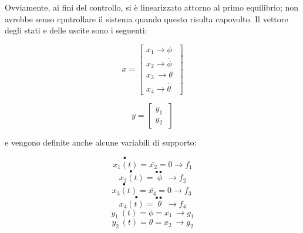 Ovviamente, ai fini del controllo, si è linearizzato attorno al primo equilibrio; non avrebbe senso cpntrollare il sistema quando questo risulta capovolto.
Il vettore degli stati e delle uscite sono i seguenti:
\begin{center}
	$$
	x=\left\lbrack \begin{array}{c}
		x_1 \to \phi \;\\
		x_2 \to \dot{\phi \;} \\
		x_{3\;} \to \theta \;\\
		x_4 \to \dot{\theta \;} 
	
		\end{array}\right\rbrack
	$$
	
	$$
	y=\left\lbrack \begin{array}{c}
	y_1\;\\
	y_2\;
	
\end{array}\right\rbrack
	$$
\end{center}
e vengono definite anche alcune variabili di supporto:
\begin{center}
	$$
	\overset{\bullet \;}{x_1 \left(t\right)} =\bar{x_2 } =0\to f_1
	$$
	$$
	\overset{\bullet \;}{x_2 \left(t\right)} =\overset{\bullet \bullet \;\;}{\phi \;} \to f_2
	$$
	$$
	\overset{\bullet \;}{x_3 \left(t\right)} =\bar{x_4 } =0\to f_{3\;}
	$$
	$$
	\overset{\bullet \;}{x_4 \left(t\right)=} \overset{\bullet \bullet \;\;}{\theta \;} \to f_4
	$$
	$$
	y_{1\;} \left(t\right)=\phi =x_{1\;} \to g_1
	$$
	$$
	y_{2\;} \left(t\right)=\theta =x_{2\;} \to g_2
	$$
\end{center}

